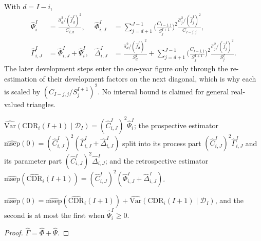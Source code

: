 \begin{definition}[Displays (3.4)-(3.7)]\label{def:mw}\leanok
{}
With $d = I - i$,
\begin{align*}
 \hat\Psi^I_i &= \frac{\hat\sigma^2_{d}/(\hat f^I_{d})^2}{C_{i,d}}, &
 \hat\Phi^I_{i,J} &= \sum_{j=d+1}^{J-1}\Big(\frac{C_{I-j,j}}{S^{I+1}_j}\Big)^2
   \frac{\hat\sigma^2_j/(\hat f^I_j)^2}{C_{I-j,j}}, \\
 \hat\Gamma^I_{i,J} &= \hat\Phi^I_{i,J} + \hat\Psi^I_i, &
 \hat\Delta^I_{i,J} &= \frac{\hat\sigma^2_{d}/(\hat f^I_{d})^2}{S^I_{d}}
   + \sum_{j=d+1}^{J-1}\Big(\frac{C_{I-j,j}}{S^{I+1}_j}\Big)^2
     \frac{\hat\sigma^2_j/(\hat f^I_j)^2}{S^I_j}.
\end{align*}
The later development steps enter the one-year figure only through the re-estimation of their
development factors on the next diagonal, which is why each is scaled by
$(C_{I-j,j}/S^{I+1}_j)^2$. No interval bound is claimed for general real-valued triangles.
\end{definition}

\begin{definition}[Displays (3.8)-(3.10)]\label{def:mwMsep}\leanok
{}
$\widehat{\mathrm{Var}}(\mathrm{CDR}_i(I+1) \mid \mathcal{D}_I) = (\hat C^I_{i,J})^2 \hat\Psi^I_i$;
the prospective estimator
$\widehat{\mathrm{msep}}(0) = (\hat C^I_{i,J})^2(\hat\Gamma^I_{i,J} + \hat\Delta^I_{i,J})$ split
into its process part $(\hat C^I_{i,J})^2\hat\Gamma^I_{i,J}$ and its parameter part
$(\hat C^I_{i,J})^2\hat\Delta^I_{i,J}$; and the retrospective estimator
$\widehat{\mathrm{msep}}(\widehat{\mathrm{CDR}}_i(I+1)) = (\hat C^I_{i,J})^2(\hat\Phi^I_{i,J} + \hat\Delta^I_{i,J})$.
\end{definition}

\begin{lemma}[Display (3.11)]\label{lem:mw_311}\leanok
{}
$\widehat{\mathrm{msep}}(0) = \widehat{\mathrm{msep}}(\widehat{\mathrm{CDR}}_i(I+1))
 + \widehat{\mathrm{Var}}(\mathrm{CDR}_i(I+1)\mid\mathcal{D}_I)$, and the second is at most the
first when $\hat\Psi^I_i \ge 0$.
\end{lemma}
\begin{proof}\leanok $\hat\Gamma = \hat\Phi + \hat\Psi$. \end{proof}

